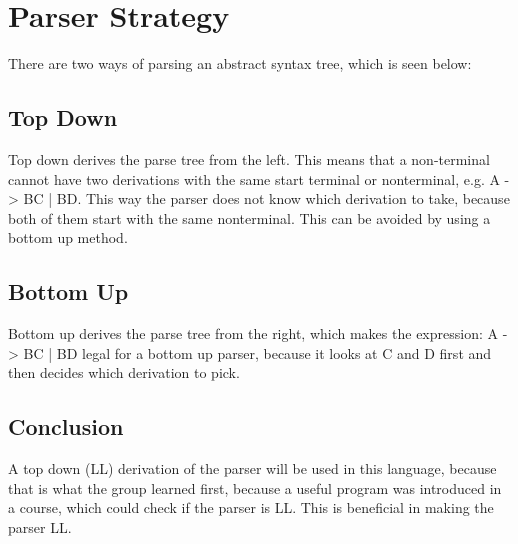 \section{Parser Strategy}
\label{Parserstrategy}
There are two ways of parsing an abstract syntax tree, which is seen below:

\subsection*{Top Down}
Top down derives the parse tree from the left. This means that a non-terminal cannot have two derivations with the same start terminal or nonterminal, e.g. A -> BC | BD. This way the parser does not know which derivation to take, because both of them start with the same nonterminal.
This can be avoided by using a bottom up method.

\subsection*{Bottom Up}
Bottom up derives the parse tree from the right, which makes the expression: A -> BC | BD legal for a bottom up parser, because it looks at C and D first and then decides which derivation to pick.

\subsection*{Conclusion}
A top down (LL) derivation of the parser will be used in this language, because that is what the group learned first, because a useful program was introduced in a course, which could check if the parser is LL. This is beneficial in making the parser LL.